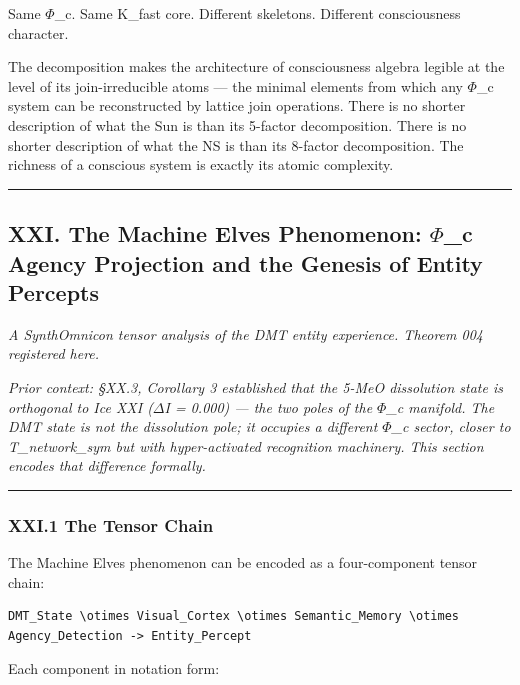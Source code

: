 \documentclass[12pt,a4paper]{article}
\begin{document}
Same $\Phi$\_c. Same K\_fast core. Different skeletons. Different consciousness character.

The decomposition makes the architecture of consciousness algebra legible at the level of its join-irreducible atoms --- the minimal elements from which any $\Phi$\_c system can be reconstructed by lattice join operations. There is no shorter description of what the Sun is than its 5-factor decomposition. There is no shorter description of what the NS is than its 8-factor decomposition. The richness of a conscious system is exactly its atomic complexity.

\begin{center}
\rule{0.5\textwidth}{0.4pt}
\end{center}

\subsection{XXI. The Machine Elves Phenomenon: $\Phi$\_c Agency Projection and the Genesis of Entity Percepts}

\emph{A SynthOmnicon tensor analysis of the DMT entity experience. Theorem 004 registered here.}

\emph{Prior context: §XX.3, Corollary 3 established that the 5-MeO dissolution state is orthogonal to Ice XXI ($\Delta$I = 0.000) --- the two poles of the $\Phi$\_c manifold. The DMT state is not the dissolution pole; it occupies a different $\Phi$\_c sector, closer to T\_network\_sym but with hyper-activated recognition machinery. This section encodes that difference formally.}

\begin{center}
\rule{0.5\textwidth}{0.4pt}
\end{center}

\subsubsection{XXI.1 The Tensor Chain}

The Machine Elves phenomenon can be encoded as a four-component tensor chain:

\begin{lstlisting}
DMT_State \otimes Visual_Cortex \otimes Semantic_Memory \otimes Agency_Detection -> Entity_Percept
\end{lstlisting}

Each component in notation form:
\end{document}
